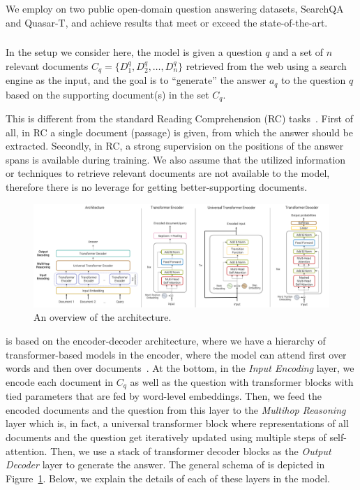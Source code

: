 We employ \tracrnet on two public open-domain question answering datasets, SearchQA and Quasar-T, and achieve results that meet or exceed the state-of-the-art. 

\subsubsection{\tracrnet} %
\label{sec:tra}
In the setup we consider here, the model is given a question $q$ and a set of $n$ relevant documents $C_q=\{D^q_1, D^q_2, \ldots, D^q_n\}$ retrieved from the web using a search engine as the input, and the goal is to ``generate'' the answer $a_q$ to the question $q$ based on the supporting document(s) in the set $C_q$.

This is different from the standard Reading Comprehension (RC) tasks~\cite{hermann2015teaching,xiong2016dynamic}. 
First of all, in RC a single document (passage) is given, from which the answer should be extracted. 
Secondly, in RC, a strong supervision on the positions of the answer spans is available during training.
We also assume that the utilized information or techniques to retrieve relevant documents are not available to the model, therefore there is no leverage for getting better-supporting documents.

\begin{figure}[!t]
 \centering
 \includegraphics[width=\textwidth]{04-part-03/chapter-06/figs_and_tables/fig_tracrnet.png}
 \caption{An overview of the \tracrnet architecture.}
 \label{fig:model_tracrnet}
\end{figure}

\tracrnet is based on the encoder-decoder architecture, where we have a hierarchy of transformer-based models in the encoder, where the model can attend first over words and then over documents~\citep{Dehghani2017:CIKM}. At the bottom, in the \emph{Input Encoding} layer, we encode each document in $C_q$ as well as the question with transformer blocks with tied parameters that are fed by word-level embeddings. 
Then, we feed the encoded documents and the question from this layer to the \emph{Multihop Reasoning} layer which is, in fact, a universal transformer block where representations of all documents and the question get iteratively updated using multiple steps of self-attention.
Then, we use a stack of transformer decoder blocks as the \emph{Output Decoder} layer to generate the answer. 
%
The general schema of \tracrnet is depicted in Figure~\ref{fig:model_tracrnet}. 
Below, we explain the details of each of these layers in the model.

